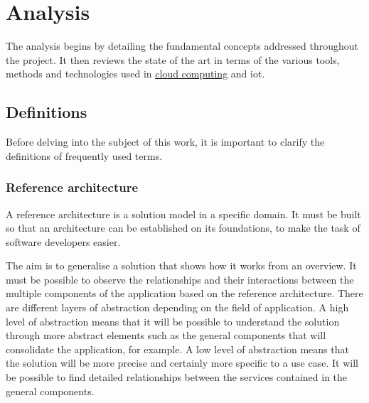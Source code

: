 

\chapter{Analysis}
\label{chap:analysis}

The analysis begins by detailing the fundamental concepts addressed throughout the project. It then reviews the state of the art in terms of the various tools, methods and technologies used in \hyperref[subsec:cloudcomputing]{cloud computing} and \acrshort{iot}.

\minitoc
\newpage

\section{Definitions}
Before delving into the subject of this work, it is important to clarify the definitions of frequently used terms.

\subsection{Reference architecture}
\label{subsec:ref_arch}
A reference architecture is a solution model in a specific domain. It must be built so that an architecture can be established on its foundations, to make the task of software developers easier.

The aim is to generalise a solution that shows how it works from an overview. It must be possible to observe the relationships and their interactions between the multiple components of the application based on the reference architecture. There are different layers of abstraction depending on the field of application. A high level of abstraction means that it will be possible to understand the solution through more abstract elements such as the general components that will consolidate the application, for example. A low level of abstraction means that the solution will be more precise and certainly more specific to a use case. It will be possible to find detailed relationships between the services contained in the general components.

